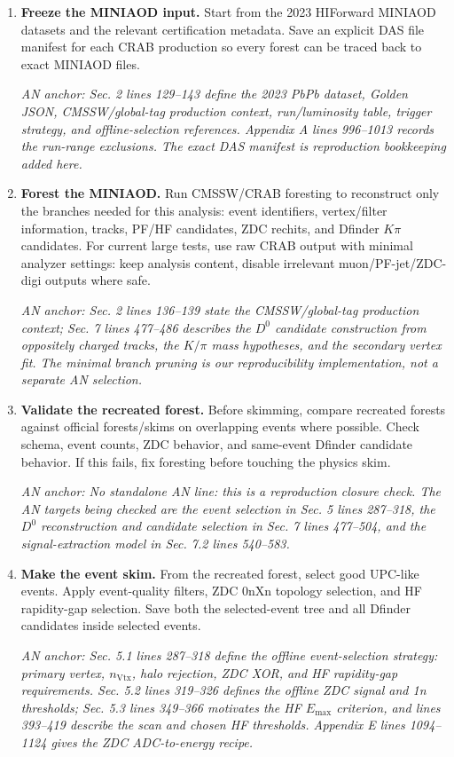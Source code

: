 \documentclass[10pt]{article}
\newcommand{\ananchor}[1]{\par{\footnotesize\emph{AN anchor: #1}}\par}
\begin{document}
\begin{enumerate}
\item \textbf{Freeze the MINIAOD input.}
Start from the 2023 HIForward MINIAOD datasets and the relevant certification
metadata. Save an explicit DAS file manifest for each CRAB production so every
forest can be traced back to exact MINIAOD files.
\ananchor{Sec. 2 lines 129--143 define the 2023 PbPb dataset, Golden JSON,
CMSSW/global-tag production context, run/luminosity table, trigger strategy,
and offline-selection references. Appendix A lines 996--1013 records the
run-range exclusions. The exact DAS manifest is reproduction bookkeeping added
here.}

\item \textbf{Forest the MINIAOD.}
Run CMSSW/CRAB foresting to reconstruct only the branches needed for this
analysis: event identifiers, vertex/filter information, tracks, PF/HF
candidates, ZDC rechits, and Dfinder \(K\pi\) candidates. For current large
tests, use raw CRAB output with minimal analyzer settings: keep analysis
content, disable irrelevant muon/PF-jet/ZDC-digi outputs where safe.
\ananchor{Sec. 2 lines 136--139 state the CMSSW/global-tag production context;
Sec. 7 lines 477--486 describes the \(D^0\) candidate construction from
oppositely charged tracks, the \(K/\pi\) mass hypotheses, and the secondary
vertex fit. The minimal branch pruning is our reproducibility implementation,
not a separate AN selection.}

\item \textbf{Validate the recreated forest.}
Before skimming, compare recreated forests against official forests/skims on
overlapping events where possible. Check schema, event counts, ZDC behavior,
and same-event Dfinder candidate behavior. If this fails, fix foresting before
touching the physics skim.
\ananchor{No standalone AN line: this is a reproduction closure check. The AN
targets being checked are the event selection in Sec. 5 lines 287--318, the
\(D^0\) reconstruction and candidate selection in Sec. 7 lines 477--504, and
the signal-extraction model in Sec. 7.2 lines 540--583.}

\item \textbf{Make the event skim.}
From the recreated forest, select good UPC-like events. Apply event-quality
filters, ZDC 0nXn topology selection, and HF rapidity-gap selection. Save both
the selected-event tree and all Dfinder candidates inside selected events.
\ananchor{Sec. 5.1 lines 287--318 define the offline event-selection strategy:
primary vertex, \(n_{\mathrm{Vtx}}\), halo rejection, ZDC XOR, and HF
rapidity-gap requirements. Sec. 5.2 lines 319--326 defines the offline ZDC
signal and 1n thresholds; Sec. 5.3 lines 349--366 motivates the HF \(E_{\max}\)
criterion, and lines 393--419 describe the scan and chosen HF thresholds.
Appendix E lines 1094--1124 gives the ZDC ADC-to-energy recipe.}


\end{enumerate}
\end{document}
